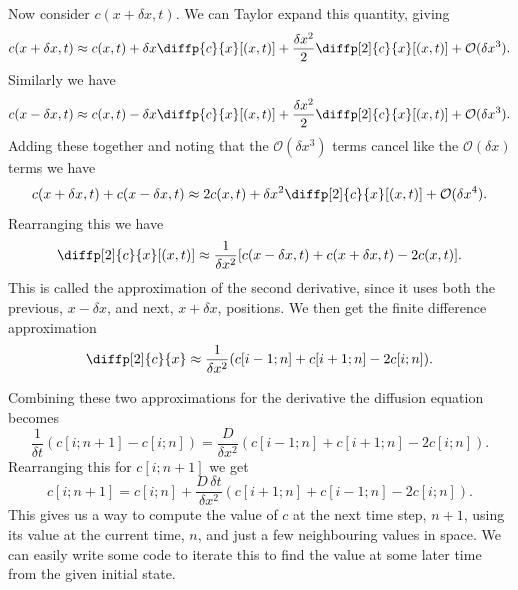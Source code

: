 \documentclass[fleqn]{NotesClass}
\newcommand*{\order}{\mathcal{O}}
\begin{document}
    Now consider \(c(x + \delta x, t)\).
    We can Taylor expand this quantity, giving
    \begin{equation}
        c(x + \delta x, t) \approx c(x, t) + \delta x\diffp{c}{x}[(x,t)] + \frac{\delta x^2}{2}\diffp[2]{c}{x}[(x,t)] + \order(\delta x^3).
    \end{equation}
    Similarly we have
    \begin{equation}
        c(x - \delta x, t) \approx c(x, t) - \delta x\diffp{c}{x}[(x, t)] + \frac{\delta x^2}{2}\diffp[2]{c}{x}[(x, t)] + \order(\delta x^3).
    \end{equation}
    Adding these together and noting that the \(\order(\delta x^3)\) terms cancel like the \(\order(\delta x)\) terms we have
    \begin{equation}
        c(x + \delta x, t) + c(x - \delta x, t) \approx 2c(x, t) + \delta x^2 \diffp[2]{c}{x}[(x, t)] + \order(\delta x^4).
    \end{equation}
    Rearranging this we have
    \begin{equation}
        \diffp[2]{c}{x}[(x, t)] \approx \frac{1}{\delta x^2}[c(x - \delta x, t) + c(x + \delta x, t) - 2c(x, t)].
    \end{equation}
    This is called the  approximation of the second derivative, since it uses both the previous, \(x - \delta x\), and next, \(x + \delta x\), positions.
    We then get the finite difference approximation
    \begin{equation}
        \diffp[2]{c}{x} \approx \frac{1}{\delta x^2}(c[i - 1; n] + c[i + 1; n] - 2c[i; n]).
    \end{equation}
    
    Combining these two approximations for the derivative the diffusion equation becomes
    \begin{equation}
        \frac{1}{\delta t}(c[i; n + 1] - c[i; n]) = \frac{D}{\delta x^2}(c[i - 1; n] + c[i + 1; n] - 2c[i; n]).
    \end{equation}
    Rearranging this for \(c[i; n + 1]\) we get
    \begin{equation}
        c[i; n + 1] = c[i; n] + \frac{D \, \delta t}{\delta x^2}(c[i + 1; n] + c[i - 1; n] - 2c[i; n]).
    \end{equation}
    This gives us a way to compute the value of \(c\) at the next time step, \(n + 1\), using its value at the current time, \(n\), and just a few neighbouring values in space.
    We can easily write some code to iterate this to find the value at some later time from the given initial state.
    
\end{document}
